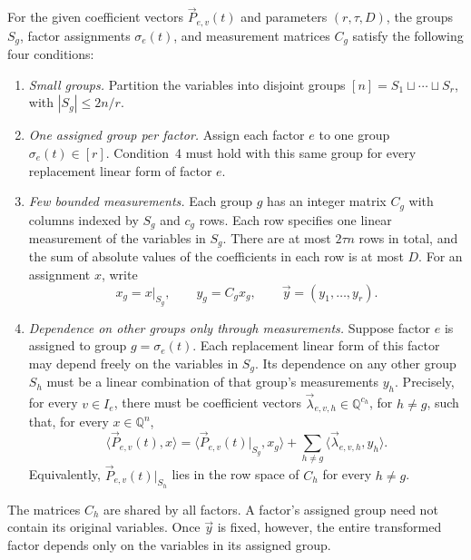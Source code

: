 \begin{definition}
\label{def:overview-measurement-structure}
For the given coefficient vectors $\vec{P}_{e,v}(t)$ and parameters $(r,\tau,D)$,
the groups $S_g$, factor assignments $\sigma_e(t)$,
and measurement matrices $C_g$ satisfy the following four
conditions:
\begin{enumerate}
\item \emph{Small groups.} Partition the variables into disjoint
groups $[n]=S_1\sqcup\cdots\sqcup S_r$, with $|S_g|\le2n/r$.
\item \emph{One assigned group per factor.} Assign each factor
$e$ to one group $\sigma_e(t)\in[r]$. Condition~4 must hold with
this same group for every replacement linear form of factor $e$.
\item \emph{Few bounded measurements.} Each group $g$ has an
integer matrix $C_g$ with columns indexed by $S_g$ and $c_g$ rows.
Each row specifies one linear measurement of the variables in
$S_g$. There are at most $2\tau n$ rows in total, and the sum of
absolute values of the coefficients in each row is at most $D$.
For an assignment $x$, write
\[
 x_g=x|_{S_g},\qquad y_g=C_gx_g,\qquad
 \vec{y}=(y_1,\ldots,y_r).
\]
\item \emph{Dependence on other groups only through measurements.}
Suppose factor $e$ is assigned to group $g=\sigma_e(t)$.
Each replacement linear form of this factor may depend freely on the
variables in $S_g$. Its dependence on any other group $S_h$ must
be a linear combination of that group's measurements $y_h$.
Precisely, for every $v\in I_e$, there must be coefficient vectors
$\vec{\lambda}_{e,v,h}\in\mathbb Q^{c_h}$, for $h\ne g$, such
that, for every $x\in\mathbb Q^n$,
\begin{equation}\label{eq:outline-separation}
 \langle\vec{P}_{e,v}(t),x\rangle
 =\langle\vec{P}_{e,v}(t)|_{S_g},x_g\rangle
   +\sum_{h\ne g}\langle\vec{\lambda}_{e,v,h},y_h\rangle.
\end{equation}
Equivalently, $\vec{P}_{e,v}(t)|_{S_h}$ lies in the row space
of $C_h$ for every $h\ne g$.
\end{enumerate}
\end{definition}
The matrices $C_h$ are shared by all factors. A factor's assigned
group need not contain its original variables. Once $\vec{y}$
is fixed, however, the entire transformed factor
depends only on the variables in its assigned group.

